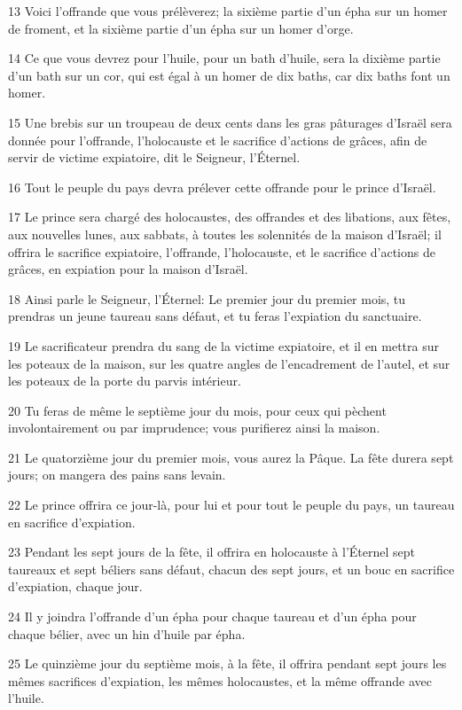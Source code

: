 \par 13 Voici l'offrande que vous prélèverez; la sixième partie d'un épha sur un homer de froment, et la sixième partie d'un épha sur un homer d'orge.
\par 14 Ce que vous devrez pour l'huile, pour un bath d'huile, sera la dixième partie d'un bath sur un cor, qui est égal à un homer de dix baths, car dix baths font un homer.
\par 15 Une brebis sur un troupeau de deux cents dans les gras pâturages d'Israël sera donnée pour l'offrande, l'holocauste et le sacrifice d'actions de grâces, afin de servir de victime expiatoire, dit le Seigneur, l'Éternel.
\par 16 Tout le peuple du pays devra prélever cette offrande pour le prince d'Israël.
\par 17 Le prince sera chargé des holocaustes, des offrandes et des libations, aux fêtes, aux nouvelles lunes, aux sabbats, à toutes les solennités de la maison d'Israël; il offrira le sacrifice expiatoire, l'offrande, l'holocauste, et le sacrifice d'actions de grâces, en expiation pour la maison d'Israël.
\par 18 Ainsi parle le Seigneur, l'Éternel: Le premier jour du premier mois, tu prendras un jeune taureau sans défaut, et tu feras l'expiation du sanctuaire.
\par 19 Le sacrificateur prendra du sang de la victime expiatoire, et il en mettra sur les poteaux de la maison, sur les quatre angles de l'encadrement de l'autel, et sur les poteaux de la porte du parvis intérieur.
\par 20 Tu feras de même le septième jour du mois, pour ceux qui pèchent involontairement ou par imprudence; vous purifierez ainsi la maison.
\par 21 Le quatorzième jour du premier mois, vous aurez la Pâque. La fête durera sept jours; on mangera des pains sans levain.
\par 22 Le prince offrira ce jour-là, pour lui et pour tout le peuple du pays, un taureau en sacrifice d'expiation.
\par 23 Pendant les sept jours de la fête, il offrira en holocauste à l'Éternel sept taureaux et sept béliers sans défaut, chacun des sept jours, et un bouc en sacrifice d'expiation, chaque jour.
\par 24 Il y joindra l'offrande d'un épha pour chaque taureau et d'un épha pour chaque bélier, avec un hin d'huile par épha.
\par 25 Le quinzième jour du septième mois, à la fête, il offrira pendant sept jours les mêmes sacrifices d'expiation, les mêmes holocaustes, et la même offrande avec l'huile.

